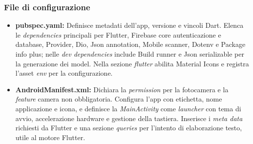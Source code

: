 \documentclass{article}
\begin{document}
\subsubsection{File di configurazione}

\begin{itemize}
  \item \textbf{pubspec.yaml:}
  Definisce metadati dell’app, versione e vincoli Dart. Elenca le \textit{dependencies} principali per Flutter, Firebase core autenticazione e database, Provider, Dio, Json annotation, Mobile scanner, Dotenv e Package info plus; nelle \textit{dev dependencies} include Build runner e Json serializable per la generazione dei model. Nella sezione \textit{flutter} abilita Material Icons e registra l’asset \textit{env} per la configurazione.
  \item \textbf{AndroidManifest.xml:}
  Dichiara la \textit{permission} per la fotocamera e la \textit{feature} camera non obbligatoria. Configura l’app con etichetta, nome applicazione e icona, e definisce la \textit{MainActivity} come \textit{launcher} con tema di avvio, accelerazione hardware e gestione della tastiera. Inserisce i \textit{meta data} richiesti da Flutter e una sezione \textit{queries} per l’intento di elaborazione testo, utile al motore Flutter.

\end{itemize}
\end{document}
